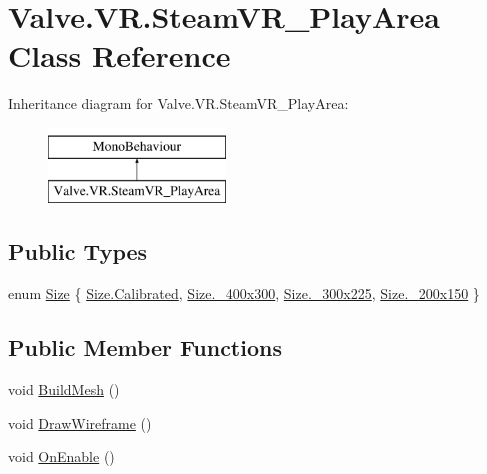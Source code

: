 \hypertarget{class_valve_1_1_v_r_1_1_steam_v_r___play_area}{}\section{Valve.\+V\+R.\+Steam\+V\+R\+\_\+\+Play\+Area Class Reference}
\label{class_valve_1_1_v_r_1_1_steam_v_r___play_area}
Inheritance diagram for Valve.\+V\+R.\+Steam\+V\+R\+\_\+\+Play\+Area\+:\begin{figure}[H]
\begin{center}
\leavevmode
\includegraphics[height=2.000000cm]{class_valve_1_1_v_r_1_1_steam_v_r___play_area}
\end{center}
\end{figure}
\subsection*{Public Types}
\begin{DoxyCompactItemize}
\item 
enum \mbox{\hyperlink{class_valve_1_1_v_r_1_1_steam_v_r___play_area_a4c0fc5be21f78998e4a1fbef713d2f24}{Size}} \{ \mbox{\hyperlink{class_valve_1_1_v_r_1_1_steam_v_r___play_area_a4c0fc5be21f78998e4a1fbef713d2f24aa4002a60656b604f448b7794842c8fb4}{Size.\+Calibrated}}, 
\mbox{\hyperlink{class_valve_1_1_v_r_1_1_steam_v_r___play_area_a4c0fc5be21f78998e4a1fbef713d2f24ad14053b351e59c48d47872fe13b43e40}{Size.\+\_\+400x300}}, 
\mbox{\hyperlink{class_valve_1_1_v_r_1_1_steam_v_r___play_area_a4c0fc5be21f78998e4a1fbef713d2f24aaaa057b1981d5abc4a573b1cb91de9b2}{Size.\+\_\+300x225}}, 
\mbox{\hyperlink{class_valve_1_1_v_r_1_1_steam_v_r___play_area_a4c0fc5be21f78998e4a1fbef713d2f24ad16fe43ac4af9b59700809af77d6a1db}{Size.\+\_\+200x150}}
 \}
\end{DoxyCompactItemize}
\subsection*{Public Member Functions}
\begin{DoxyCompactItemize}
\item 
void \mbox{\hyperlink{class_valve_1_1_v_r_1_1_steam_v_r___play_area_a5e44e8adf0b54427bcba8d6724a87edd}{Build\+Mesh}} ()
\item 
void \mbox{\hyperlink{class_valve_1_1_v_r_1_1_steam_v_r___play_area_aa80fbe05c10df6dd528393dd3f267c77}{Draw\+Wireframe}} ()
\item 
void \mbox{\hyperlink{class_valve_1_1_v_r_1_1_steam_v_r___play_area_ae33aa0029b69029db1fde8b47dfcdb71}{On\+Enable}} ()
\end{DoxyCompactItemize}
